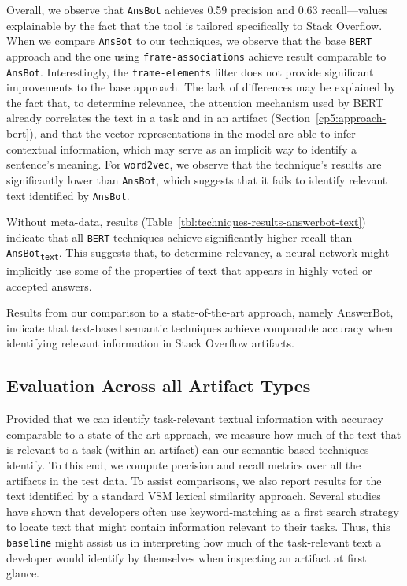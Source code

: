 


Overall, we observe that \texttt{AnsBot} achieves 0.59 precision and 0.63 recall---values explainable by the fact that the tool is tailored specifically to Stack Overflow.
When we compare \texttt{AnsBot} to our techniques, we observe that the base
 \texttt{BERT} approach and the one using \texttt{frame-associations} achieve result comparable to \texttt{AnsBot}. Interestingly, the \texttt{frame-elements} filter does not provide significant improvements to the base approach. 
The lack of differences may be explained by the fact that, to determine relevance, the attention mechanism used by BERT already correlates the text in a task and in an artifact (Section~\ref{cp5:approach-bert}), 
and that the vector representations in the model are able to infer contextual information, which may serve as an implicit way to identify a sentence's meaning.
For \texttt{word2vec}, we observe that the technique's results are significantly lower than \texttt{AnsBot}, which suggests that it fails to identify relevant text identified by \texttt{AnsBot}. 


Without meta-data, 
results (Table~\ref{tbl:techniques-results-answerbot-text})
 indicate that
all \texttt{BERT} techniques
achieve significantly higher recall than \texttt{AnsBot\textsubscript{text}}.
This suggests that, to determine relevancy, a neural network might implicitly 
use some of the properties of text that appears in highly voted or accepted answers.





Results from our comparison to a state-of-the-art approach, namely AnswerBot, 
indicate that text-based semantic techniques achieve comparable accuracy  
when identifying relevant information in Stack Overflow artifacts.




\subsection{Evaluation Across all Artifact Types}
\label{cp5:results-all}





Provided that we can identify task-relevant textual information with accuracy comparable to a state-of-the-art approach, 
we measure how much of the text that is relevant to a task (within an artifact)
can our semantic-based techniques identify.
To this end, we compute precision and recall metrics over all the artifacts in the test data. 
To assist comparisons, we also report results for the text identified by a
standard VSM lexical similarity approach. Several studies~\cite{Ko2006a, Freund2015, marques2020}
have shown that developers often use keyword-matching as a first search strategy to locate text that might contain information relevant to their tasks.
Thus, this \texttt{baseline} might assist us in interpreting 
how much of the task-relevant text a developer would identify by themselves
when inspecting an artifact at first glance.



